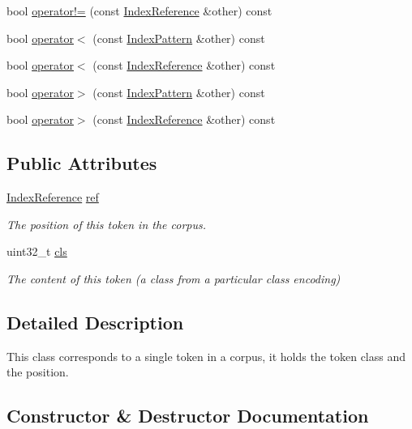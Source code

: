 \begin{DoxyCompactItemize}
bool \hyperlink{classIndexPattern_af5532c5cbcc5a5077bf7fdebcd20af1b}{operator!=} (const \hyperlink{classIndexReference}{Index\+Reference} \&other) const 
\item 
bool \hyperlink{classIndexPattern_ab28599c650b1c84716c38142493975af}{operator$<$} (const \hyperlink{classIndexPattern}{Index\+Pattern} \&other) const 
\item 
bool \hyperlink{classIndexPattern_af8a7fe38ec0ca30fbc97809d5c9d7592}{operator$<$} (const \hyperlink{classIndexReference}{Index\+Reference} \&other) const 
\item 
bool \hyperlink{classIndexPattern_a02099d74e554356fa8e990cb07960a7b}{operator$>$} (const \hyperlink{classIndexPattern}{Index\+Pattern} \&other) const 
\item 
bool \hyperlink{classIndexPattern_aba9892ad04f5b8d03d46052306fec78f}{operator$>$} (const \hyperlink{classIndexReference}{Index\+Reference} \&other) const 
\end{DoxyCompactItemize}
\subsection*{Public Attributes}
\begin{DoxyCompactItemize}
\item 
\hyperlink{classIndexReference}{Index\+Reference} \hyperlink{classIndexPattern_a068a44839584d00943b1fe06a5166dc9}{ref}
\begin{DoxyCompactList}\small\item\em The position of this token in the corpus. \end{DoxyCompactList}\item 
uint32\+\_\+t \hyperlink{classIndexPattern_afedfcca7851b65e8abca346df1d57e84}{cls}
\begin{DoxyCompactList}\small\item\em The content of this token (a class from a particular class encoding) \end{DoxyCompactList}\end{DoxyCompactItemize}


\subsection{Detailed Description}
This class corresponds to a single token in a corpus, it holds the token class and the position. 

\subsection{Constructor \& Destructor Documentation}
\hypertarget{classIndexPattern_afd5aa833be918a676a1365b088df03ec}{}
